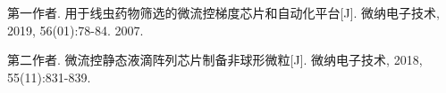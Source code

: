 
\begin{publications}{99}
    \item\textsc{第一作者}. {用于线虫药物筛选的微流控梯度芯片和自动化平台}[J]. 微纳电子技术, 2019, 56(01):78-84.                                          2007.  
    \item\textsc{第二作者}. {微流控静态液滴阵列芯片制备非球形微粒}[J]. 微纳电子技术, 2018, 55(11):831-839.
\end{publications}
